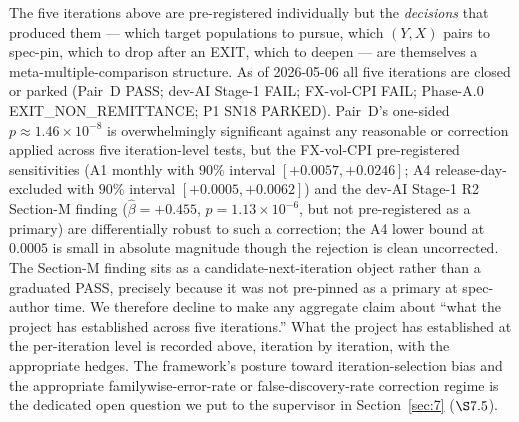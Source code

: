 The five iterations above are pre-registered individually but the
\emph{decisions} that produced them --- which target populations to
pursue, which \((Y, X)\) pairs to spec-pin, which to drop after an
EXIT, which to deepen --- are themselves a meta-multiple-comparison
structure. As of 2026-05-06 all five iterations are closed or parked
(Pair~D PASS; dev-AI Stage-1 FAIL; FX-vol-CPI FAIL; Phase-A.0
EXIT\_NON\_REMITTANCE; P1 SN18 PARKED). Pair~D's one-sided
\(p \approx 1.46 \times 10^{-8}\) is overwhelmingly significant against
any reasonable \citet{benjaminihochberg1995} or \citet{romanowolf2005}
correction applied across five iteration-level tests, but the
FX-vol-CPI pre-registered sensitivities (A1 monthly with \(90\%\)
interval \([+0.0057, +0.0246]\); A4 release-day-excluded with \(90\%\)
interval \([+0.0005, +0.0062]\)) and the dev-AI Stage-1 R2 Section-M
finding (\(\hat{\beta} = +0.455\), \(p = 1.13 \times 10^{-6}\), but
not pre-registered as a primary) are differentially robust to such a
correction; the A4 lower bound at \(0.0005\) is small in absolute
magnitude though the rejection is clean uncorrected. The Section-M
finding sits as a candidate-next-iteration object rather than a
graduated PASS, precisely because it was not pre-pinned as a primary
at spec-author time. We therefore decline to make any aggregate claim
about ``what the project has established across five iterations.''
What the project has established at the per-iteration level is
recorded above, iteration by iteration, with the appropriate hedges.
The framework's posture toward iteration-selection bias and the
appropriate familywise-error-rate or false-discovery-rate correction
regime is the dedicated open question we put to the supervisor in
Section~\ref{sec:7} (\(\S 7.5\)).

